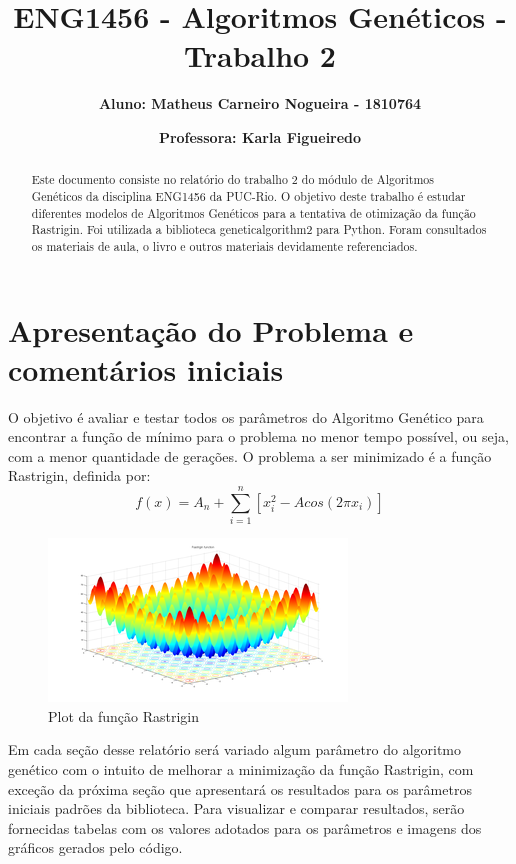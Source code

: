 \documentclass[12pt]{article}
\title{\textbf{ENG1456 - Algoritmos Genéticos - Trabalho 2}}
\author{\textbf{Aluno: Matheus Carneiro Nogueira - 1810764}}
\affil{}
\author{\textbf{Professora: Karla Figueiredo}}
\affil{}
\date{}
\begin{document}
	\maketitle
	
	
\begin{abstract}
	Este documento consiste no relatório do trabalho 2 do módulo de Algoritmos Genéticos da disciplina ENG1456 da PUC-Rio. O objetivo deste trabalho é estudar diferentes modelos de Algoritmos Genéticos para a tentativa de otimização da função Rastrigin. Foi utilizada a biblioteca geneticalgorithm2 para Python. Foram consultados os materiais de aula, o livro \cite{davis1991handbook} e outros materiais devidamente referenciados. 
\end{abstract}
	
\section{Apresentação do Problema e comentários iniciais}

O objetivo é avaliar e testar todos os parâmetros do Algoritmo Genético para encontrar a função de mínimo para o problema no menor tempo possível, ou seja, com a menor quantidade de gerações. O problema a ser minimizado é a função Rastrigin, definida por:
\begin{equation*}
	f(x)=A_n+\sum_{i=1}^{n}[x_i^2-Acos(2\pi x_i)]
\end{equation*}

\begin{figure}[H]
	\centering
	\includegraphics[width=0.7\linewidth]{Imagens/Rastrigin_function}
	\caption{Plot da função Rastrigin}
	\label{fig:rastriginfunction}
\end{figure}

Em cada seção desse relatório será variado algum parâmetro do algoritmo genético com o intuito de melhorar a minimização da função Rastrigin, com exceção da próxima seção que apresentará os resultados para os parâmetros iniciais padrões da biblioteca. Para visualizar e comparar resultados, serão fornecidas tabelas com os valores adotados para os parâmetros e imagens dos gráficos gerados pelo código.
\end{document}
